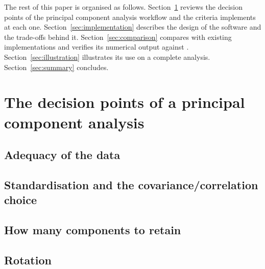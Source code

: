 \documentclass[article]{jss}
\begin{document}
The rest of this paper is organised as follows.
Section~\ref{sec:methods} reviews the decision points of the principal component
analysis workflow and the criteria  implements at each one.
Section~\ref{sec:implementation} describes the design of the software and the
trade-offs behind it.
Section~\ref{sec:comparison} compares  with existing implementations and
verifies its numerical output against .
Section~\ref{sec:illustration} illustrates its use on a complete analysis.
Section~\ref{sec:summary} concludes.

\section{The decision points of a principal component analysis} \label{sec:methods}


\subsection{Adequacy of the data}

\subsection{Standardisation and the covariance/correlation choice}

\subsection{How many components to retain}

\subsection{Rotation}
\end{document}
